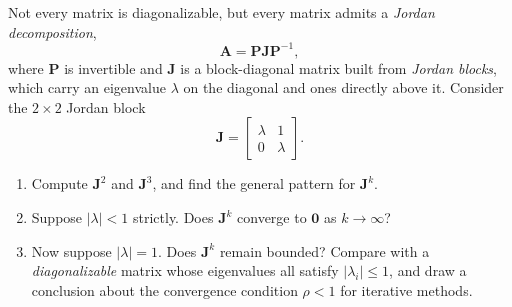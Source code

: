\begin{exercise} %
    Not every matrix is diagonalizable, but every matrix admits a \emph{Jordan decomposition},
    \begin{equation*}
        \mathbf{A} = \mathbf{P}\mathbf{J}\mathbf{P}^{-1},
    \end{equation*}
    where $\mathbf{P}$ is invertible and $\mathbf{J}$ is a block-diagonal matrix built from \emph{Jordan blocks}, which carry an eigenvalue $\lambda$ on the diagonal and ones directly above it. Consider the $2 \times 2$ Jordan block
    \begin{equation*}
        \mathbf{J} = \begin{bmatrix} \lambda & 1 \\ 0 & \lambda \end{bmatrix}.
    \end{equation*}
    \begin{enumerate}[label=(\alph*)]
        \item Compute $\mathbf{J}^2$ and $\mathbf{J}^3$, and find the general pattern for $\mathbf{J}^k$.
        \item Suppose $|\lambda| < 1$ strictly. Does $\mathbf{J}^k$ converge to $\mathbf{0}$ as $k \to \infty$?
        \item Now suppose $|\lambda| = 1$. Does $\mathbf{J}^k$ remain bounded? Compare with a \emph{diagonalizable} matrix whose eigenvalues all satisfy $|\lambda_i| \leq 1$, and draw a conclusion about the convergence condition $\rho < 1$ for iterative methods.
    \end{enumerate}
\end{exercise}

